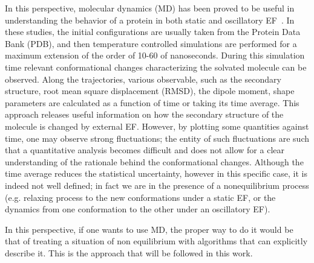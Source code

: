 \documentclass[a4paper,preprint,unsortedaddress,onecolumn]{revtex4-1}
\begin{document}
In this perspective, molecular dynamics (MD) has been proved to be useful in
understanding the behavior of a protein 
in both static and oscillatory EF~\cite{budi2005electric, budi2007effect, budi2008comparative,
  toschi2008effects, astrakas2011electric, astrakas2012structural,
  damm2012can, starzyk2013proteins, english2009nonequilibrium,
  solomentsev2012effects}. In these studies, the initial
configurations are usually taken from the Protein Data Bank (PDB),
and then temperature controlled simulations are performed for a maximum extension of the order of 10-60 of nanoseconds.
During this simulation time 
relevant conformational changes characterizing the solvated molecule can be observed. 
Along the trajectories, various observable, such as the
secondary structure, root mean square displacement (RMSD), the dipole
moment, shape parameters are calculated as a function of time or taking its time average. This approach releases useful information on how the
secondary structure of the molecule is changed by external  EF.  However,
by plotting some quantities against time, one may observe strong
fluctuations; the entity of such fluctuations are such that a quantitative 
analysis becomes difficult and does not allow for  a clear understanding of the rationale behind the conformational changes.
Although the time average reduces the statistical uncertainty,
however in this specific case, it is indeed not well defined;
in fact we are in the presence of a nonequilibrium process
(e.g. relaxing process to the new conformations under a static
EF, or the dynamics from one conformation to the other under an oscillatory EF).

In this perspective, if one wants to use MD, the proper way to do it would be that of treating a situation of non equilibrium with algorithms that can explicitly describe it. This is the approach that will be followed in this work.
\end{document}
